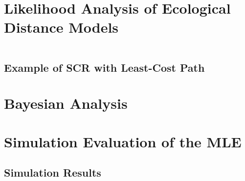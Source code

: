 \begin{figure}
\begin{center}
\end{center}
\label{fig.homeranges}
\end{figure}


\section{Likelihood Analysis of Ecological Distance Models}
\label{ecoldist.sec.mle}

\begin{equation}
\label{ecoldist.eq.cond-on-s}
\end{equation}



\subsection{Example of SCR with Least-Cost Path}


\section{Bayesian Analysis}


\section{Simulation Evaluation of the MLE}


\subsection{Simulation Results}

\begin{table}[h]
\centering
\begin{tabular}{l|rrrr}
\end{tabular}
\label{tab.samplesize}
\end{table}

\begin{table}[htp]
\label{tab.results1}
\end{table}


\begin{table}[htp]
\centering
\begin{tabular}{l|rrrr}
\end{tabular}
\label{tab.results2}
\end{table}




\begin{table}[htp]
\begin{tabular}{l|rrrrr|rrrrr}
\end{tabular}
\label{tab.results3}
\end{table}





